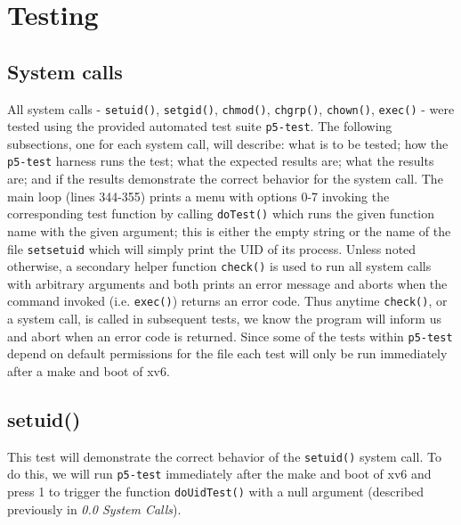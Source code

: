 \documentclass[11pt,letterpaper]{report}
\begin{document}
	\newpage
	
	
	
	\section*{Testing}
	
	\subsection*{System calls}
	All system calls - {\tt setuid()}, {\tt setgid()}, {\tt chmod()}, {\tt chgrp()}, {\tt chown()}, {\tt exec()} -  
	were tested using the provided automated test suite {\tt p5-test}. 
	The following subsections, one for each system call, will describe: what is to be tested; how the {\tt p5-test} harness runs the test; what the expected results are; 
	what the results are; and if the results demonstrate the correct behavior for the system call. The main loop (lines 344-355) prints a menu with options 0-7 invoking the corresponding test
	function by calling {\tt doTest()} which runs the given function name with the given argument; this is either the empty string or the name of the file {\tt setsetuid} which 
	will simply print the UID of its process. Unless noted otherwise, a secondary helper function {\tt check()} is used to run all system calls with arbitrary arguments and both prints an error 
	message and 
	aborts when the command
	invoked (i.e. {\tt exec()}) returns an error code. Thus anytime {\tt check()}, or a system call, is called in subsequent tests, we know the program will inform us and abort when an 
	error code is returned. Since some of the tests within {\tt p5-test} depend on default permissions for the file each test will only be run immediately after a make and boot of xv6.
	
	\subsection{setuid()}
	This test will demonstrate the correct behavior of the {\tt setuid()} system call. To do this, we will run {\tt p5-test} immediately after the make and boot of xv6 
	and press 1 to trigger the function {\tt doUidTest()} with a null argument (described previously in \emph{0.0 System Calls}). 
\end{document}
